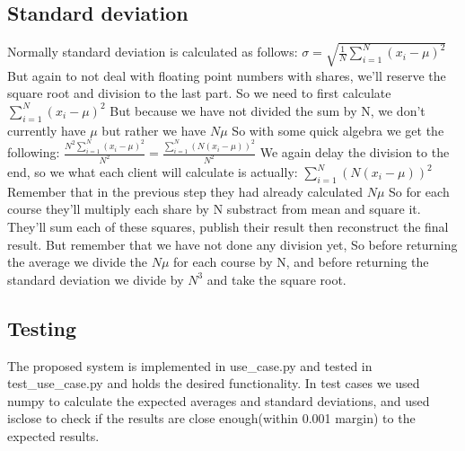 \documentclass[10pt,conference,compsocconf]{IEEEtran}
\begin{document}
\subsection{Standard deviation}
Normally standard deviation is calculated as follows:
\begin{math}
\sigma = \sqrt{\frac{1}{N}\sum_{i=1}^{N}(x_i - \mu)^2}
\end{math}
But again to not deal with floating point numbers with shares, we'll reserve the square root and division to the last part.
So we need to first calculate
\begin{math}
    \sum_{i=1}^{N}(x_i - \mu)^2
\end{math}
But because we have not divided the sum by N, we don't currently have \begin{math}
    \mu
\end{math} but rather we have
\begin{math}
    N\mu
\end{math}
So with some quick algebra we get the following:
\begin{math}
    \frac{N^2\sum_{i=1}^{N}(x_i - \mu)^2}{N^2} = \frac{\sum_{i=1}^{N}(N(x_i - \mu))^2}{N^2}
\end{math}
We again delay the division to the end, so we what each client will calculate is actually:
\begin{math}
    \sum_{i=1}^{N}(N(x_i - \mu))^2
\end{math}
Remember that in the previous step they had already calculated \begin{math}
    N\mu
\end{math} 
So for each course they'll multiply each share by N substract from mean and square it. They'll sum each of these squares, publish their result then reconstruct the final result.
But remember that we have not done any division yet, So before returning the average we divide the \begin{math} N\mu \end{math} for each course by N, and before returning the standard deviation we divide by \begin{math}
    N^3
\end{math} and take the square root.
\subsection{Testing}
The proposed system is implemented in use\_case.py and tested in test\_use\_case.py and holds the desired functionality. In test cases we used numpy to calculate the expected averages and standard deviations, 
and used isclose to check if the results are close enough(within 0.001 margin) to the expected results.

\end{document}
